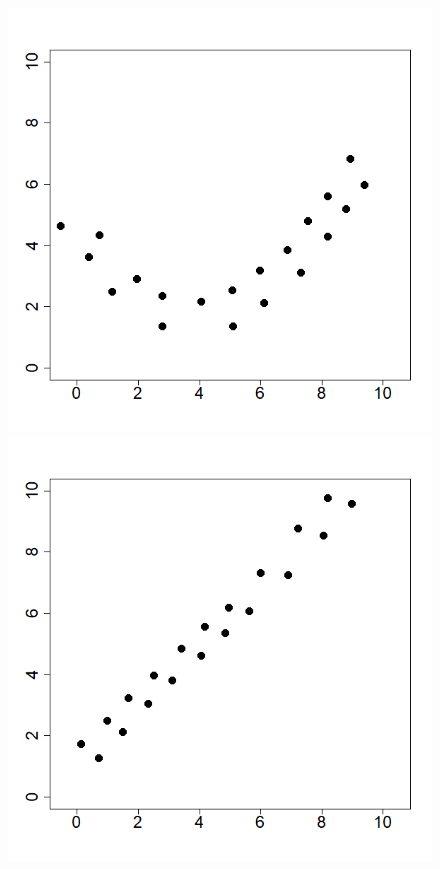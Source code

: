 \documentclass[captions=tableheading, 12pt, headings=small, parskip=half]{scrartcl}
\begin{document}
\begin{figure}[H]
\begin{minipage}{0.32 \columnwidth}
	\end{minipage}
	\hfill
	\begin{minipage}{0.32 \columnwidth}
		\includegraphics[width = \columnwidth]{Code1/plot2.png}
		\includegraphics[width = \columnwidth]{Code1/plot5.png}

\end{minipage}
\end{figure}
\end{document}
